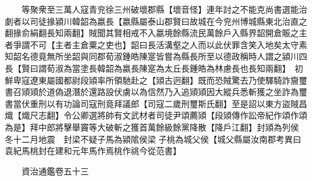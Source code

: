 　　等聚衆至三萬人寇青兖徐三州破壞郡縣【壞音怪】連年討之不能克尚書選能治劇者以司徒掾潁川韓韶為嬴長【嬴縣屬泰山郡賢曰故城在今兖州博城縣東北治直之翻掾俞絹翻長知兩翻】賊聞其賢相戒不入嬴境餘縣流民萬餘戶入縣界韶開倉賑之主者爭謂不可【主者主倉粟之吏也】韶曰長活溝壑之人而以此伏罪含笑入地矣太守素知韶名德竟無所坐韶與同郡荀淑鍾皓陳寔皆嘗為縣長所至以德政稱時人謂之潁川四長【賢曰謂荀淑為當塗長韓韶為嬴長陳寔為太丘長鍾皓為林慮長也長知兩翻】　初鮮卑寇遼東屬國都尉段熲率所領馳赴之【熲古迥翻】既而恐賊驚去乃使驛騎詐齎璽書召熲熲於道偽退潛於還路設伏虜以為信然乃入追熲熲因大縱兵悉斬獲之坐詐為璽書當伏重刑以有功論司寇刑竟拜議郎【司寇二歲刑璽斯氏翻】至是詔以東方盜賊昌熾【熾尺志翻】令公卿選將帥有文武材者司徒尹頌薦熲【段熲傳作訟帝紀作頌作頌為是】拜中郎將擊舉竇等大破斬之獲首萬餘級餘黨降散【降戶江翻】封熲為列侯　冬十二月地震　封梁不疑子馬為潁隂侯梁子桃為城父侯【城父縣屬汝南郡考異曰袁紀馬桃封在建和元年馬作焉桃作祧今從范書】

　　資治通鑑卷五十三  
    


 


 



 

 
  







 


　　
　　
　
　
　


　　

　















	
	









































